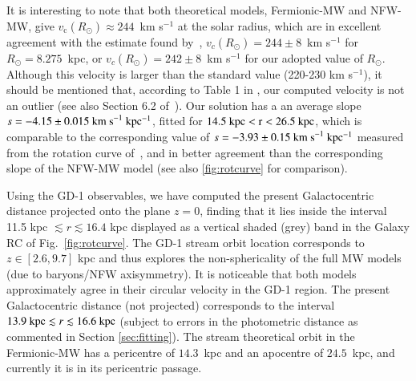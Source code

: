 \documentclass[twocolumn]{aa}
\begin{document}
It is interesting to note that both theoretical models, Fermionic-MW and NFW-MW, give $v_\mathrm{c}(R_\odot)\approx 244$~km s$^{-1}$ at the solar radius, which are in excellent agreement with the estimate found
by~\citet{2020arXiv201202169B}, $v_c(R_\odot)=244\pm 8$~km s$^{-1}$ for $R_\odot = 8.275$~kpc, or $v_c(R_\odot)=242\pm 8$~km s$^{-1}$ for our adopted value of $R_\odot$. Although this velocity is larger than the standard value (220-230 km s$^{-1}$), it should be mentioned
that, according to Table 1 in \citet{sofue_2020}, our computed velocity is not an outlier (see also Section 6.2 of~\citealt{Honma_2012}).
Our solution has a an average slope $s=-4.15\pm0.015~\rm{km~s}^{-1}~kpc^{-1}$, fitted for $14.5~\rm{kpc} < r < 26.5~\rm{kpc}$, which is 
comparable to the corresponding value of $s=-3.93\pm0.15~\rm{km~s}^{-1}~kpc^{-1}$ measured from the rotation curve of~\citet{Jiao2023}, and in better agreement than the corresponding slope of the NFW-MW model (see also \cref{fig:rotcurve} for comparison).

Using the GD-1 observables, we have computed the present Galactocentric distance projected onto the plane $z=0$, finding that it lies inside the interval 11.5 kpc $\lesssim r \lesssim 16.4$ kpc displayed as a vertical shaded (grey) band in the Galaxy RC of Fig.~\ref{fig:rotcurve}. The GD-1 stream orbit location corresponds to $z\in [2.6, 9.7]$ kpc and thus explores the non-sphericality of the full MW models (due to baryons/NFW axisymmetry).
It is noticeable that both models approximately agree in their circular velocity in the GD-1 region. 
The present Galactocentric distance (not projected) corresponds to the interval $13.9~\textrm{kpc} \lesssim r \lesssim 16.6~\rm{kpc}$ (subject to errors in the photometric distance as commented in Section \ref{sec:fitting}). The stream theoretical orbit in the Fermionic-MW has a pericentre of $14.3$~kpc and an apocentre of $24.5$~kpc, and currently it is in its pericentric passage.
\end{document}
